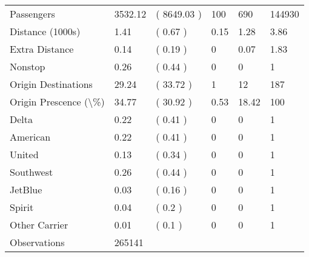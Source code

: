 \begin{tabular}[t]{llllll}
\hspace{1em}Passengers & 3532.12 & ( 8649.03 ) & 100 & 690 & 144930\\
\hspace{1em}Distance (1000s) & 1.41 & ( 0.67 ) & 0.15 & 1.28 & 3.86\\
\hspace{1em}Extra Distance & 0.14 & ( 0.19 ) & 0 & 0.07 & 1.83\\
\hspace{1em}Nonstop & 0.26 & ( 0.44 ) & 0 & 0 & 1\\
\hspace{1em}Origin Destinations & 29.24 & ( 33.72 ) & 1 & 12 & 187\\
\hspace{1em}Origin Prescence (\textbackslash{}\%) & 34.77 & ( 30.92 ) & 0.53 & 18.42 & 100\\
\hspace{1em}Delta & 0.22 & ( 0.41 ) & 0 & 0 & 1\\
\hspace{1em}American & 0.22 & ( 0.41 ) & 0 & 0 & 1\\
\hspace{1em}United & 0.13 & ( 0.34 ) & 0 & 0 & 1\\
\hspace{1em}Southwest & 0.26 & ( 0.44 ) & 0 & 0 & 1\\
\hspace{1em}JetBlue & 0.03 & ( 0.16 ) & 0 & 0 & 1\\
\hspace{1em}Spirit & 0.04 & ( 0.2 ) & 0 & 0 & 1\\
\hspace{1em}Other Carrier & 0.01 & ( 0.1 ) & 0 & 0 & 1\\
\hspace{1em}Observations & 265141 &  &  &  & \\
\bottomrule
\end{tabular}
